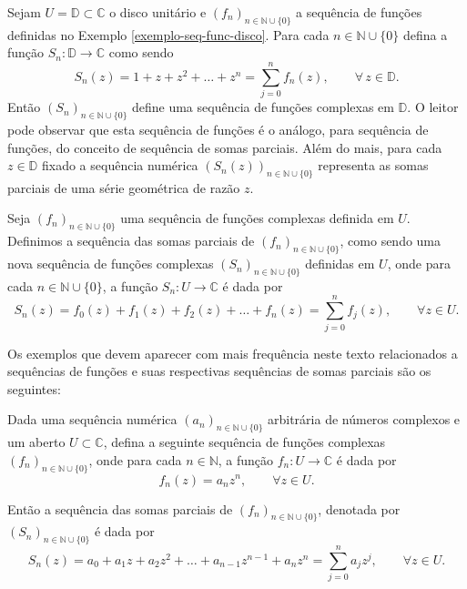 \begin{exemplo}
Sejam $U=\mathbb{D}\subset\mathbb{C}$ o disco unitário e 
$(f_n)_{n\in\mathbb{N}\cup\{0\}}$ a sequência de funções 
definidas no Exemplo \ref{exemplo-seq-func-disco}.
Para cada $n\in\mathbb{N}\cup\{0\}$
defina a função $S_n:\mathbb{D}\to\mathbb{C}$ como sendo
\[
S_n(z) = 1+z+z^2+\ldots+z^n = \sum_{j=0}^{n} f_n(z), \qquad \forall\, z\in\mathbb{D}.
\]
Então $(S_n)_{n\in\mathbb{N}\cup\{0\}}$ define uma sequência de funções complexas 
em $\mathbb{D}$. O leitor pode observar que esta sequência de funções é o análogo, 
para sequência de funções, do conceito de sequência de somas parciais. 
Além do mais, para cada $z\in\mathbb{D}$ fixado a sequência numérica
$(S_n(z))_{n\in\mathbb{N}\cup\{0\}}$ representa 
as somas parciais de uma série geométrica de razão $z$. 
\end{exemplo}



\begin{definicao}
\label{def-seq-somasparciais-funcoes}
Seja $(f_n)_{n\in\mathbb{N}\cup\{0\}}$ uma sequência de funções complexas 
definida em $U$. Definimos a sequência das somas parciais
de $(f_n)_{n\in\mathbb{N}\cup\{0\}}$, como sendo uma nova sequência de funções 
complexas $(S_n)_{n\in\mathbb{N}\cup\{0\}}$ definidas em $U$, onde 
para cada $n\in\mathbb{N}\cup\{0\}$, a função $S_n:U\to\mathbb{C}$ é dada por 
\[
S_n(z) = f_0(z)+f_1(z)+f_2(z)+\ldots+f_n(z) = \sum_{j=0}^n f_j(z),
\qquad \forall z\in U.
\]
\end{definicao}


Os exemplos que devem aparecer com mais frequência neste texto relacionados
a sequências de funções e suas respectivas sequências de somas parciais são
os seguintes: 

\begin{exemplo}\label{exe-seq-fun-series-pot}
Dada uma sequência numérica $(a_n)_{n\in\mathbb{N}\cup\{0\}}$ arbitrária 
de números complexos e um aberto $U\subset\mathbb{C}$, 
defina a seguinte sequência de funções complexas 
$(f_n)_{n\in\mathbb{N}\cup\{0\}}$, onde para cada $n\in\mathbb{N}$, 
a função $f_n:U\to\mathbb{C}$ é dada por
\[
f_n(z) = a_nz^n, \qquad \forall z\in U.
\] 

Então a sequência das somas parciais de $(f_n)_{n\in\mathbb{N}\cup\{0\}}$,
denotada por $(S_n)_{n\in\mathbb{N}\cup\{0\}}$ é dada por 
\[
S_n(z) = a_0+a_1z+a_2z^2+\ldots +a_{n-1}z^{n-1}+a_nz^n = \sum_{j=0}^n a_jz^j, 
\qquad \forall z\in U.
\]
\end{exemplo}



